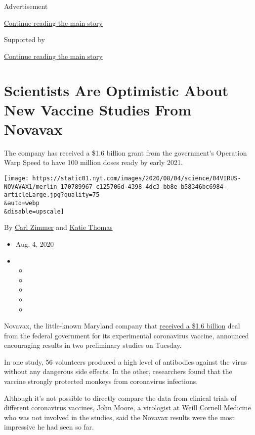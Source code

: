 Advertisement

\protect\hyperlink{after-top}{Continue reading the main story}

Supported by

\protect\hyperlink{after-sponsor}{Continue reading the main story}

\hypertarget{scientists-are-optimistic-about-new-vaccine-studies-from-novavax}{%
\section{Scientists Are Optimistic About New Vaccine Studies From
Novavax}\label{scientists-are-optimistic-about-new-vaccine-studies-from-novavax}}

The company has received a \$1.6 billion grant from the government's
Operation Warp Speed to have 100 million doses ready by early 2021.

\texttt{[image: https://static01.nyt.com/images/2020/08/04/science/04VIRUS-NOVAVAX1/merlin\_170789967\_c125706d-4398-4dc3-bb8e-b58346bc6984-articleLarge.jpg?quality=75\\\&auto=webp\\\&disable=upscale]}

By \href{https://www.nytimes.com/by/carl-zimmer}{Carl Zimmer} and
\href{https://www.nytimes.com/by/katie-thomas}{Katie Thomas}

\begin{itemize}
\item
  Aug. 4, 2020
\item
  \begin{itemize}
  \item
  \item
  \item
  \item
  \item
  \end{itemize}
\end{itemize}

Novavax, the little-known Maryland company that
\href{https://www.nytimes.com/2020/07/16/health/coronavirus-vaccine-novavax.html}{received
a \$1.6 billion} deal from the federal government for its experimental
coronavirus vaccine, announced encouraging results in two preliminary
studies on Tuesday.

In one study, 56 volunteers produced a high level of antibodies against
the virus without any dangerous side effects. In the other, researchers
found that the vaccine strongly protected monkeys from coronavirus
infections.

Although it's not possible to directly compare the data from clinical
trials of different coronavirus vaccines, John Moore, a virologist at
Weill Cornell Medicine who was not involved in the studies, said the
Novavax results were the most impressive he had seen so far.

